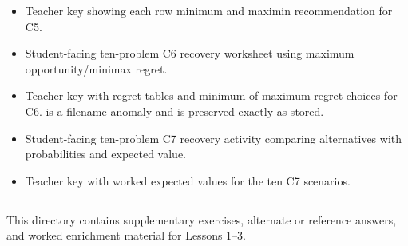 \begin{itemize}
  \item {}

  Teacher key showing each row minimum and maximin recommendation for C5.

  \item {}

  Student-facing ten-problem C6 recovery worksheet using maximum opportunity/minimax regret.

  \item {}

  Teacher key with regret tables and minimum-of-maximum-regret choices for C6.  is a filename anomaly and is preserved exactly as stored.

  \item {}

  Student-facing ten-problem C7 recovery activity comparing alternatives with probabilities and expected value.

  \item {}

  Teacher key with worked expected values for the ten C7 scenarios.
\end{itemize}

\subsection{}

This directory contains supplementary exercises, alternate or reference answers, and worked enrichment material for Lessons 1–3.

